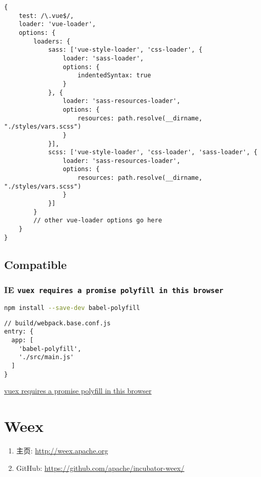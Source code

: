 \begin{lstlisting}
{
    test: /\.vue$/,
    loader: 'vue-loader',
    options: {
        loaders: {
            sass: ['vue-style-loader', 'css-loader', {
                loader: 'sass-loader',
                options: {
                    indentedSyntax: true
                }
            }, {
                loader: 'sass-resources-loader',
                options: {
                    resources: path.resolve(__dirname, "./styles/vars.scss")
                }
            }],
            scss: ['vue-style-loader', 'css-loader', 'sass-loader', {
                loader: 'sass-resources-loader',
                options: {
                    resources: path.resolve(__dirname, "./styles/vars.scss")
                }
            }]
        }
        // other vue-loader options go here
    }
}
\end{lstlisting}

\subsection{Compatible}\label{compatible}

\subsubsection{\texorpdfstring{IE
\texttt{vuex\ requires\ a\ promise\ polyfill\ in\ this\ browser}}{IE vuex requires a promise polyfill in this browser}}\label{ie-vuex-requires-a-promise-polyfill-in-this-browser}

\begin{lstlisting}[language=bash]
npm install --save-dev babel-polyfill
\end{lstlisting}

\begin{lstlisting}
// build/webpack.base.conf.js
entry: {
  app: [
    'babel-polyfill',
    './src/main.js'
  ]
}
\end{lstlisting}

\href{https://github.com/vuejs-templates/webpack/issues/474}{vuex
requires a promise polyfill in this browser}

\section{Weex}\label{weex}

\begin{enumerate}
\def\labelenumi{\arabic{enumi}.}
\tightlist
\item
  主页: \url{http://weex.apache.org}
\item
  GitHub: \url{https://github.com/apache/incubator-weex/}
\end{enumerate}


